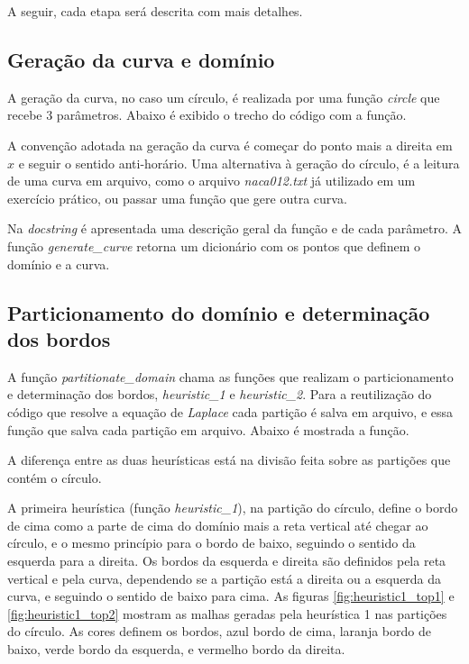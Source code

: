 \documentclass[a4paper]{article}
\begin{document}
A seguir, cada etapa será descrita com mais detalhes.


\subsection{Geração da curva e domínio}

A geração da curva, no caso um círculo, é realizada por uma função \textit{circle} que recebe 3 parâmetros. Abaixo é exibido o trecho do código com a função.


A convenção adotada na geração da curva é começar do ponto mais a direita em $x$ e seguir o sentido anti-horário.
Uma alternativa à geração do círculo, é a leitura de uma curva em arquivo, como o arquivo \textit{naca012.txt} já utilizado em um exercício prático, ou passar uma função que gere outra curva.



Na \textit{docstring} é apresentada uma descrição geral da função e de cada parâmetro.
A função \textit{generate\_curve} retorna um dicionário com os pontos que definem o domínio e a curva.


\subsection{Particionamento do domínio e determinação dos bordos}

A função \textit{partitionate\_domain} chama as funções que realizam o particionamento e determinação dos bordos, \textit{heuristic\_1} e \textit{heuristic\_2}. Para a reutilização do código que resolve a equação de \textit{Laplace} cada partição é salva em arquivo, e essa função que salva cada partição em arquivo.
Abaixo é mostrada a função.


A diferença entre as duas heurísticas está na divisão feita sobre as partições que contém o círculo.

A primeira heurística (função \textit{heuristic\_1}), na partição do círculo, define o bordo de cima como a parte de cima do domínio mais a reta vertical até chegar ao círculo, e o mesmo princípio para o bordo de baixo, seguindo o sentido da esquerda para a direita. Os bordos da esquerda e direita são definidos pela reta vertical e pela curva, dependendo se a partição está a direita ou a esquerda da curva, e seguindo o sentido de baixo para cima.
As figuras \ref{fig:heuristic1_top1} e \ref{fig:heuristic1_top2} mostram as malhas geradas pela heurística 1 nas partições do círculo. As cores definem os bordos, azul bordo de cima, laranja bordo de baixo, verde bordo da esquerda, e vermelho bordo da direita.
\end{document}
